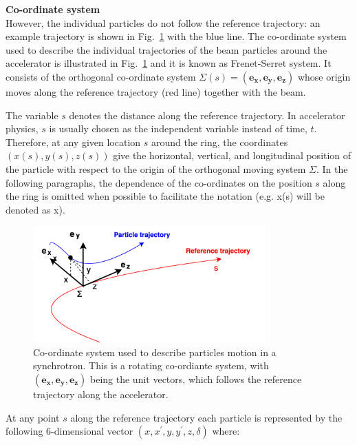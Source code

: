 
\textbf{Co-ordinate system}\\
However, the individual particles do not follow the reference trajectory: an example trajectory is shown in Fig.~\ref{fig:coordinate_system} with the blue line. The co-ordinate system used to describe the individual trajectories of the beam particles around the accelerator is illustrated in Fig.~\ref{fig:coordinate_system} and it is known as Frenet-Serret system.  It consists of the orthogonal co-ordinate system $\Sigma(s) = (\mathbf{e_x}, \mathbf{e_y}, \mathbf{e_z})$ whose origin moves along the reference trajectory (red line) together with the beam. 

The variable $s$ denotes the distance along the reference trajectory. In accelerator physics, $s$ is usually chosen as the independent variable instead of time, $t$.  %
Therefore, at any given location $s$ around the ring, the coordinates $(x(s), y(s), z(s))$ give the horizontal, vertical, and longitudinal position of the particle with respect to the origin of the orthogonal moving system $\Sigma$. In the following paragraphs, the dependence of the co-ordinates on the position $s$ along the ring is omitted when possible to facilitate the notation (e.g. x(s) will be denoted as x).

\begin{figure}[!h] %
    \centering         
    \includegraphics[width=0.8\textwidth]{images/Ch2/coordinates_particle_motion.png}
        \caption{Co-ordinate system used to describe particles motion in a synchrotron. This is a rotating co-ordiante system, with $(\mathbf{e_x, e_y, e_z})$ being the unit vectors, which follows the reference trajectory along the accelerator.}
        \label{fig:coordinate_system}
 \end{figure}


 At any point $s$ along the reference trajectory each particle is represented by the following 6-dimensional vector $(x, x^{\prime}, y, y^{\prime}, z, \delta)$ where:

